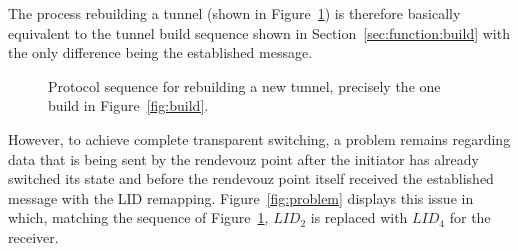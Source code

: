\documentclass[paper=letter, fontsize=12pt]{article}
\begin{document}
The process rebuilding a tunnel (shown in Figure~\ref{fig:rebuild}) is therefore basically equivalent to the tunnel build sequence shown in Section~\ref{sec:function:build} with the only difference being the established message.

\begin{figure}[ht]
    \caption{Protocol sequence for rebuilding a new tunnel, precisely the one build in Figure~\ref{fig:build}.}
    \label{fig:rebuild}
\end{figure}

However, to achieve complete transparent switching, a problem remains regarding data that is being sent by the rendevouz point after the initiator has already switched its state and before the rendevouz point itself received the established message with the LID remapping. Figure~\ref{fig:problem} displays this issue in which, matching the sequence of Figure~\ref{fig:rebuild}, $LID_2$ is replaced with $LID_4$ for the receiver.
\end{document}
